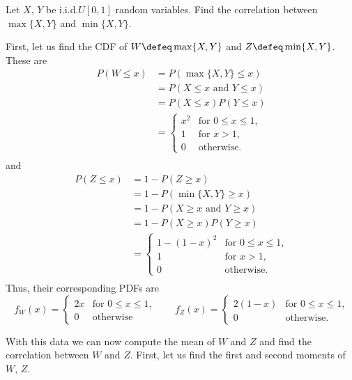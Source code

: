 \begin{problem}[Handout 17, \# 19]
  Let \(X\), \(Y\) be i.i.d.\@ \(U[0,1]\) random variables. Find the
  correlation between \(\max\{X,Y\}\) and \(\min\{X,Y\}\).
\end{problem}
\begin{solution}
  First, let us find the CDF of \(W\defeq \max\{X,Y\}\) and \(Z\defeq
  \min\{X,Y\}\). These are
  \begin{align*}
    P(W\leq x)
    &=P(\max\{X,Y\}\leq x)\\
    &=P(\text{\(X\leq x\) and \(Y\leq x\)})\\
    &=P(X\leq x)P(Y\leq x)\\
    &=\begin{cases}
      x^2&\text{for \(0\leq x\leq 1\),}\\
      1&\text{for \(x>1\),}\\
      0&\text{otherwise.}
    \end{cases}\\
  \end{align*}
  and
  \begin{align*}
    P(Z\leq x)
    &=1-P(Z\geq x)\\
    &=1-P(\min\{X,Y\}\geq x)\\
    &=1-P(\text{\(X\geq x\) and \(Y\geq x\)})\\
    &=1-P(X\geq x)P(Y\geq x)\\
    &=\begin{cases}
      1-(1-x)^2&\text{for \(0\leq x\leq 1\),}\\
      1&\text{for \(x>1\),}\\
      0&\text{otherwise.}
    \end{cases}\\  \end{align*}
  Thus, their corresponding PDFs are
  \[
    f_W(x)=
    \begin{cases}
      2x&\text{for \(0\leq x\leq 1\),}\\
      0&\text{otherwise}
    \end{cases}\qquad
    f_Z(x)=
    \begin{cases}
      2(1-x)&\text{for \(0\leq x\leq 1\),}\\
      0&\text{otherwise.}
    \end{cases}
  \]

  With this data we can now compute the mean of \(W\) and \(Z\) and find
  the correlation between \(W\) and \(Z\). First, let us find the first and
  second moments of \(W\), \(Z\).


\end{solution}
